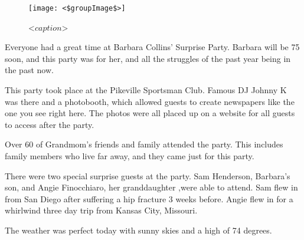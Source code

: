 \documentclass[letterpaper,11pt]{article}
\date{\today}
\begin{document}
\maketitle

\begin{figure}[h]
    \centering
    \texttt{[image: <\$groupImage\$>]}
    \caption{<$caption$>}
\end{figure}

\begin{multicols}{3}
    Everyone had a great time at Barbara Collins' Surprise Party. Barbara
    will be 75 soon, and this party
    was for her, and all the struggles of the past year being in the past
    now.
    
    This party
    took place at the Pikeville Sportsman Club. Famous DJ Johnny K was there and a
    photobooth, which allowed guests to create newspapers like the one you
    see right here. The photos were all placed up on a website for all
    guests to access after the party.

    Over 60
    of Grandmom's friends and family attended the party. This
    includes family members who live far away, and they came just for
    this party.

    \closearticle


    There were two special surprise guests at the party. Sam Henderson, Barbara's son,
    and Angie Finocchiaro, her granddaughter ,were able to attend. Sam flew in from San
    Diego after suffering a hip fracture 3 weeks before. Angie flew in for a whirlwind
    three day trip from Kansas City, Missouri.
    \closearticle

    The weather was perfect today with sunny skies and a high of 74 degrees.



    \closearticle

\end{multicols}
\end{document}
